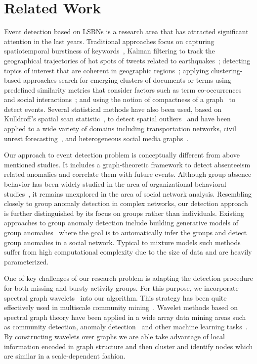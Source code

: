 \section{Related Work} \label{sec:related}
Event detection based on LSBNs is a research area that has attracted significant attention in the last years. Traditional approaches focus on capturing spatiotemporal burstiness of keywords~\cite{lappas2009burstiness,lappas2012spatiotemporal}, Kalman filtering to track the geographical trajectories of hot spots of tweets related to earthquakes~\cite{sakaki2010earthquake}; detecting topics of interest that are coherent in geographic regions~\cite{eisenstein2010latent,hong2012discovering,yin2011geographical}; applying clustering-based approaches search for emerging clusters of documents or terms using predefined similarity metrics that consider factors such as term co-occurrences and social interactions~\cite{aggarwal2012event,sayyadi2009event,watanabe2011jasmine,weng2011event}; and using the notion of compactness of a graph~\cite{rozenshtein2014event} to detect events. Several statistical methods have also been used, based on Kulldroff’s spatial scan statistic~\cite{kulldorff1997spatial}, to detect spatial outliers~\cite{chen2008detecting} and have been applied to a wide variety of domains including transportation networks, civil unrest forecasting~\cite{zhao2014unsupervised}, and heterogeneous social media graphs~\cite{chen2014non}.

Our approach to event detection problem is conceptually different from above mentioned studies. It includes a graph-theoretic framework to detect absenteeism related anomalies and correlate them with future events. Although group absence behavior has been widely studied in the area of organizational behavioral studies~\cite{gaudine2001effects,seamonds1982stress}, it remains unexplored in the area of social network analysis. Resembling closely to group anomaly detection in complex networks, our detection approach is further distinguished by its focus on groups rather than individuals. Existing approaches to group anomaly detection include building generative models of group anomalies~\cite{xiong2011hierarchical,yu2014glad} where the goal is to automatically infer the groups and detect group anomalies in a social network. Typical to mixture models such methods suffer from high computational complexity due to the size of data and are heavily parameterized.

One of key challenges of our research problem is adapting the detection procedure for both missing and bursty activity groups. For this purpose, we incorporate spectral graph wavelets~\cite{hammond2011wavelets} into our algorithm. This strategy has been quite effectively used in multiscale community mining~\cite{tremblay2014graph}.
Wavelet methods based on spectral graph theory have been applied in a wide array data mining areas such as community detection, anomaly detection~\cite{calderara2011detecting} and other machine learning tasks~\cite{shuman_ACHA_2013,ghosh2003wavelet,rustamov2013wavelets,2000wavecluster}. By constructing wavelets over graphs we are able take advantage of local information encoded in graph structure and then cluster and identify nodes which are similar in a scale-dependent fashion.

